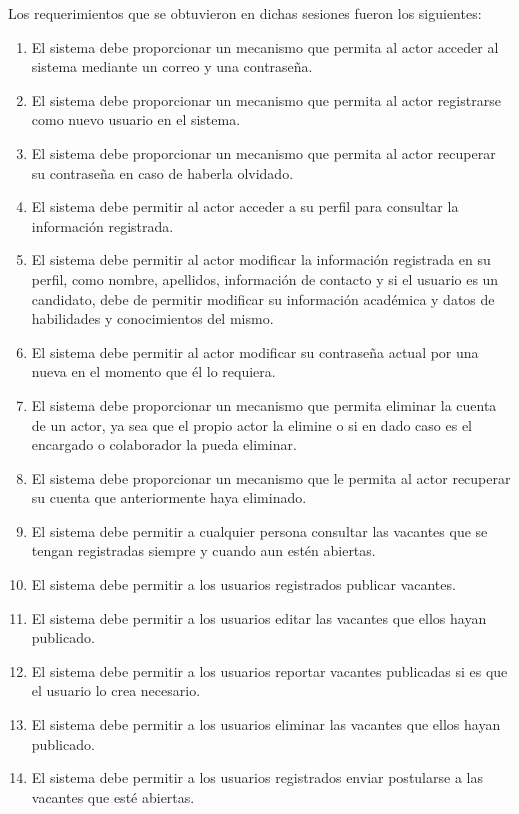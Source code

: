     Los requerimientos que se obtuvieron en dichas sesiones fueron los siguientes:
    \begin{enumerate}
        \item El sistema debe proporcionar un mecanismo que permita al actor acceder al sistema mediante un correo y una contraseña.
        \item El sistema debe proporcionar un mecanismo que permita al actor registrarse como nuevo usuario en el sistema.
        \item El sistema debe proporcionar un mecanismo que permita al actor recuperar su contraseña en caso de haberla olvidado.
        \item El sistema debe permitir al actor acceder a su perfil para consultar la información registrada.
        \item El sistema debe permitir al actor modificar la información registrada en su perfil, como nombre, apellidos, información de contacto y si el usuario es un candidato, debe de permitir modificar su información académica y datos de habilidades y conocimientos del mismo.
        \item El sistema debe permitir al actor modificar su contraseña actual por una nueva en el momento que él lo requiera.
        \item El sistema debe proporcionar un mecanismo que permita eliminar la cuenta de un actor, ya sea que el propio actor la elimine o si en dado caso es el encargado o colaborador la pueda eliminar.
        \item El sistema debe proporcionar  un mecanismo que le permita al actor recuperar su cuenta que anteriormente haya eliminado.
        \item El sistema debe permitir a cualquier persona consultar las vacantes que se tengan registradas siempre y cuando aun estén abiertas.
        \item El sistema debe permitir  a los usuarios registrados publicar vacantes.
        \item El sistema debe permitir a los usuarios editar las vacantes que ellos hayan publicado.
        \item El sistema debe permitir a los usuarios reportar vacantes publicadas si es que el usuario lo crea necesario.
        \item El sistema debe permitir a los usuarios eliminar las vacantes que ellos hayan publicado.
        \item El sistema debe permitir a los usuarios registrados enviar postularse a  las vacantes que esté abiertas.

\end{enumerate}
